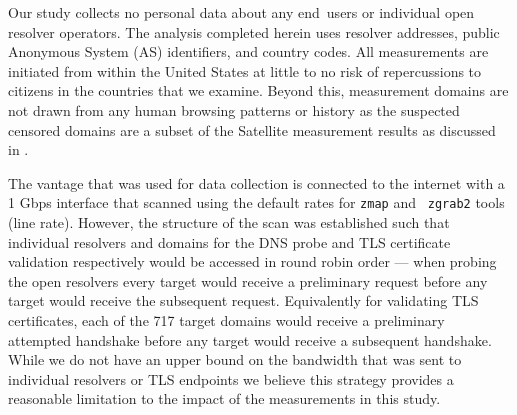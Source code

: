 Our study collects no personal data about any end~users or individual open
resolver operators. The analysis completed herein uses resolver addresses,
public Anonymous System (AS) identifiers, and country codes.  All measurements
are initiated from within the United States at little to no risk of
repercussions to citizens in the countries that we examine. Beyond this,
measurement domains are not drawn from any human browsing patterns or history
as the suspected censored domains are a subset of the Satellite measurement
results as discussed in .

The vantage that was used for data collection is connected to the internet with
a 1 Gbps interface that scanned using the default rates for {\tt zmap} and {\tt
zgrab2} tools (line rate). However, the structure of the scan was established
such that individual resolvers and domains for the DNS probe and TLS
certificate validation respectively would be accessed in round robin order ---
\ie when probing the open resolvers every target would receive a preliminary
request before any target would receive the subsequent request.  Equivalently
for validating TLS certificates, each of the 717 target domains would receive
a preliminary attempted handshake before any target would receive a subsequent
handshake. While we do not have an upper bound on the bandwidth that was sent
to individual resolvers or TLS endpoints we believe this strategy provides
a reasonable limitation to the impact of the measurements in this study.
